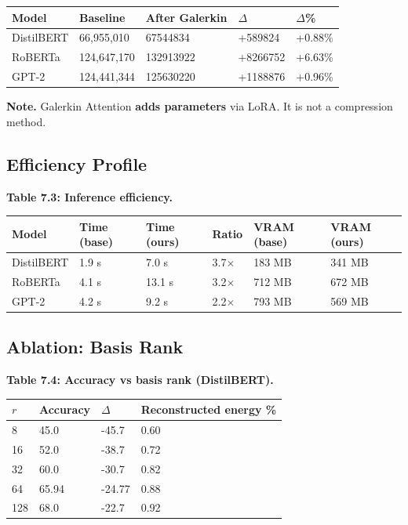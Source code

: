 \begin{table}[H]
\centering
\small
\begin{tabular}{lllll}
\toprule
\textbf{Model} & \textbf{Baseline} & \textbf{After Galerkin} & \textbf{$\Delta$} & \textbf{$\Delta$\%} \\
\midrule
DistilBERT & 66,955,010 & 67544834 & +589824 & +0.88\% \\
RoBERTa & 124,647,170 & 132913922 & +8266752 & +6.63\% \\
GPT-2 & 124,441,344 & 125630220 & +1188876 & +0.96\% \\
\bottomrule
\end{tabular}
\end{table}

\textbf{Note.} Galerkin Attention \textbf{adds parameters} via LoRA. It is not a 
compression method.

\subsection{Efficiency Profile}

\textbf{Table 7.3: Inference efficiency.}

\begin{table}[H]
\centering
\small
\begin{tabular}{llllll}
\toprule
\textbf{Model} & \textbf{Time (base)} & \textbf{Time (ours)} & \textbf{Ratio} & \textbf{VRAM (base)} & \textbf{VRAM (ours)} \\
\midrule
DistilBERT & 1.9 s & 7.0 s & 3.7$\times$ & 183 MB & 341 MB \\
RoBERTa & 4.1 s & 13.1 s & 3.2$\times$ & 712 MB & 672 MB \\
GPT-2 & 4.2 s & 9.2 s & 2.2$\times$ & 793 MB & 569 MB \\
\bottomrule
\end{tabular}
\end{table}

\subsection{Ablation: Basis Rank}

\textbf{Table 7.4: Accuracy vs basis rank (DistilBERT).}

\begin{table}[H]
\centering
\small
\begin{tabular}{llll}
\toprule
\textbf{$r$} & \textbf{Accuracy} & \textbf{$\Delta$} & \textbf{Reconstructed energy \%} \\
\midrule
8 & 45.0 & -45.7 & 0.60 \\
16 & 52.0 & -38.7 & 0.72 \\
32 & 60.0 & -30.7 & 0.82 \\
64 & 65.94 & -24.77 & 0.88 \\
128 & 68.0 & -22.7 & 0.92 \\
\bottomrule
\end{tabular}
\end{table}

